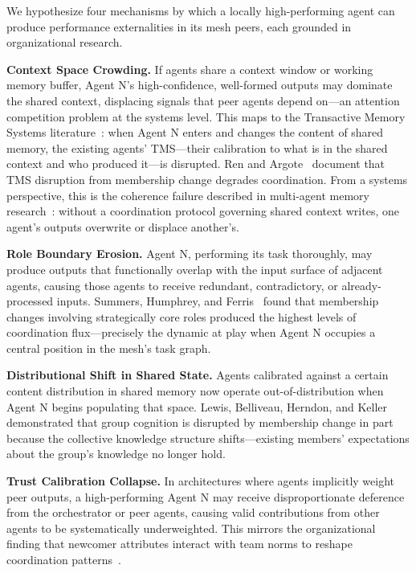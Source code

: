 \documentclass[conference]{IEEEtran}
\begin{document}
We hypothesize four mechanisms by which a locally high-performing agent can
produce performance externalities in its mesh peers, each grounded in
organizational research.

\textbf{Context Space Crowding.} If agents share a context window or working
memory buffer, Agent N's high-confidence, well-formed outputs may dominate the
shared context, displacing signals that peer agents depend on---an attention
competition problem at the systems level. This maps to the Transactive Memory
Systems literature~\cite{wegner1987transactive,lewis2007group,ren2011transactive}:
when Agent N enters and changes the content of shared memory, the existing
agents' TMS---their calibration to what is in the shared context and who
produced it---is disrupted. Ren and Argote~\cite{ren2011transactive} document
that TMS disruption from membership change degrades coordination. From a systems
perspective, this is the coherence failure described in multi-agent memory
research~\cite{fu2026memory}: without a coordination protocol governing shared
context writes, one agent's outputs overwrite or displace another's.

\textbf{Role Boundary Erosion.} Agent N, performing its task thoroughly, may
produce outputs that functionally overlap with the input surface of adjacent
agents, causing those agents to receive redundant, contradictory, or
already-processed inputs. Summers, Humphrey, and Ferris~\cite{summers2012team}
found that membership changes involving strategically core roles produced the
highest levels of coordination flux---precisely the dynamic at play when Agent
N occupies a central position in the mesh's task graph.

\textbf{Distributional Shift in Shared State.} Agents calibrated against a
certain content distribution in shared memory now operate out-of-distribution
when Agent N begins populating that space. Lewis, Belliveau, Herndon, and
Keller~\cite{lewis2007group} demonstrated that group cognition is disrupted by
membership change in part because the collective knowledge structure
shifts---existing members' expectations about the group's knowledge no longer
hold.

\textbf{Trust Calibration Collapse.} In architectures where agents implicitly
weight peer outputs, a high-performing Agent N may receive disproportionate
deference from the orchestrator or peer agents, causing valid contributions
from other agents to be systematically underweighted. This mirrors the
organizational finding that newcomer attributes interact with team norms to
reshape coordination patterns~\cite{trainer2020membership}.
\end{document}

